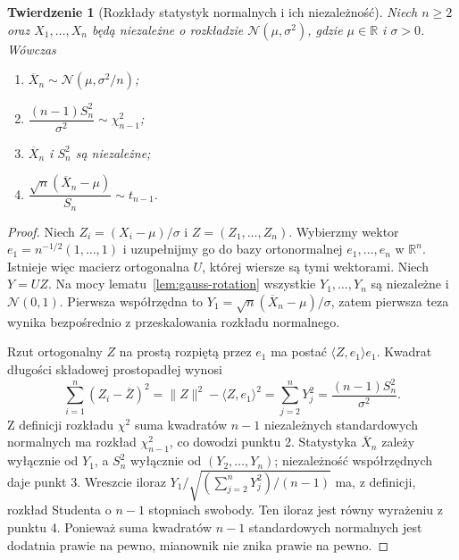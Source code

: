 \documentclass[11pt,a4paper,oneside]{report}
\numberwithin{equation}{chapter}
\theoremstyle{plain}
\newtheorem{twierdzenie}{Twierdzenie}[chapter]
\theoremstyle{definition}
\theoremstyle{remark}
\newcommand{\R}{\mathbb R}
\newcommand{\norm}[1]{\lVert#1\rVert}
\newcommand{\Normal}{\mathcal N}
\begin{document}
\begin{twierdzenie}[Rozkłady statystyk normalnych i ich niezależność]\label{thm:normal-sampling}
Niech $n\ge2$ oraz $X_1,\ldots,X_n$ będą niezależne o rozkładzie $\Normal(\mu,\sigma^2)$, gdzie $\mu\in\R$ i $\sigma>0$. Wówczas
\begin{enumerate}
\item $\overline X_n\sim\Normal(\mu,\sigma^2/n)$;
\item $\dfrac{(n-1)S_n^2}{\sigma^2}\sim\chi^2_{n-1}$;
\item $\overline X_n$ i $S_n^2$ są niezależne;
\item $\dfrac{\sqrt n(\overline X_n-\mu)}{S_n}\sim t_{n-1}$.
\end{enumerate}
\end{twierdzenie}
\begin{proof}
Niech $Z_i=(X_i-\mu)/\sigma$ i $Z=(Z_1,\ldots,Z_n)$. Wybierzmy wektor $e_1=n^{-1/2}(1,\ldots,1)$ i uzupełnijmy go do bazy ortonormalnej $e_1,\ldots,e_n$ w $\R^n$. Istnieje więc macierz ortogonalna $U$, której wiersze są tymi wektorami. Niech $Y=UZ$. Na mocy lematu~\ref{lem:gauss-rotation} wszystkie $Y_1,\ldots,Y_n$ są niezależne i $\Normal(0,1)$. Pierwsza współrzędna to $Y_1=\sqrt n(\overline X_n-\mu)/\sigma$, zatem pierwsza teza wynika bezpośrednio z przeskalowania rozkładu normalnego.

Rzut ortogonalny $Z$ na prostą rozpiętą przez $e_1$ ma postać $\langle Z,e_1\rangle e_1$. Kwadrat długości składowej prostopadłej wynosi
\[
\sum_{i=1}^n\left(Z_i-\overline Z\right)^2
=\norm Z^2-\langle Z,e_1\rangle^2
=\sum_{j=2}^nY_j^2
=\frac{(n-1)S_n^2}{\sigma^2}.
\]
Z definicji rozkładu $\chi^2$ suma kwadratów $n-1$ niezależnych standardowych normalnych ma rozkład $\chi^2_{n-1}$, co dowodzi punktu 2. Statystyka $\overline X_n$ zależy wyłącznie od $Y_1$, a $S_n^2$ wyłącznie od $(Y_2,\ldots,Y_n)$; niezależność współrzędnych daje punkt 3. Wreszcie iloraz $Y_1/\sqrt{(\sum_{j=2}^nY_j^2)/(n-1)}$ ma, z definicji, rozkład Studenta o $n-1$ stopniach swobody. Ten iloraz jest równy wyrażeniu z punktu 4. Ponieważ suma kwadratów $n-1$ standardowych normalnych jest dodatnia prawie na pewno, mianownik nie znika prawie na pewno.
\end{proof}
\end{document}
